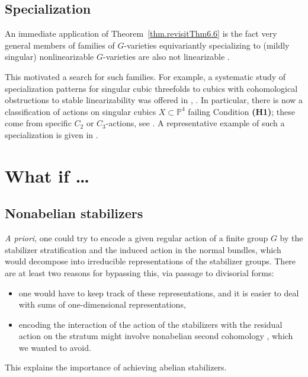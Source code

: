 \documentclass[12pt,reqno]{amsart}
\theoremstyle{plain}
\theoremstyle{remark}
\theoremstyle{definition}
\numberwithin{equation}{section}
\newcommand{\bP}{{\mathbb P}}
\begin{document}
 
\subsection*{Specialization}

An immediate application of Theorem~\ref{thm.revisitThm6.6} is the fact very general members of families of $G$-varieties equivariantly specializing to (mildly singular) nonlinearizable $G$-varieties are also not linearizable \cite[Cor.\ 6.8, Exa.\ 6.9]{BnG}.

This motivated a search for such families. For example, a systematic study of specialization patterns for singular cubic threefolds to cubics with cohomological obstructions to stable linearizability was offered in \cite{CTZ-forum}, \cite{CMTZ}. In particular, there is now a classification of actions on singular cubics $X\subset\bP^4$ failing Condition {\bf (H1)};  these come from specific $C_2$ or $C_3$-actions, see \cite[Sect.\ 2]{CTZ-real}. A representative example of such a specialization is given in \cite[Prop.~4.3]{CTZ-forum}.







\section{What if \dots}
\label{sect:scifi}


\subsection*{Nonabelian stabilizers}
\label{ss.nonabelian}
{\em A priori}, one could try to encode a given regular action of a finite group $G$ by the stabilizer stratification and the induced action in the normal 
bundles, which would decompose into irreducible representations of the stabilizer groups. There are at least two reasons for bypassing this, via passage to divisorial forms: 
\begin{itemize}
\item one would have to keep track of these representations, and it is easier to deal with sums of one-dimensional representations,
\item encoding the interaction of the action of the stabilizers with the residual action on the stratum might involve nonabelian second cohomology \cite{giraud}, which we wanted to avoid. 
\end{itemize}
This explains the importance of achieving abelian stabilizers.
\end{document}
